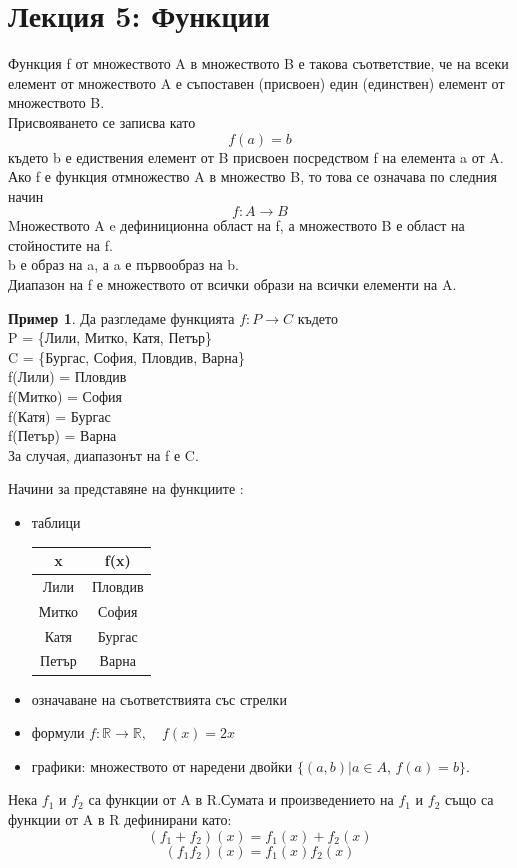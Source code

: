 \documentclass[fleqn, 12pt]{article}
\theoremstyle{definition}
\newtheorem{example}{Пример}[subsection]
\begin{document}
\section{Лекция 5: Функции}
Функция f от множеството A в множеството B е такова съответствие, че на всеки  елемент от множеството A е съпоставен (присвоен) един (единствен) елемент от множеството B.\\
Присвояването се записва като 
$$f(a) = b$$ 
където b е едиствения елемент от B присвоен посредством f на елемента a от A. Ако f е функция отмножество A в множество B, то това се означава по следния начин 
$$f: A \rightarrow B$$
Mножеството A  e дефиниционна област на f, а множеството B е област на стойностите на f. \\
b е образ на a, а a е първообраз на b. \\
Диапазон на f е множеството от всички образи на всички  елементи на A.\\
\begin{example}
Да разгледаме функцията $f: P \rightarrow C$ където \\
P = \{Лили, Митко, Катя, Петър\} \\
C = \{Бургас, София, Пловдив, Варна\}\\
f(Лили) = Пловдив \\
f(Митко) = София \\
f(Катя) = Бургас \\
f(Петър) = Варна \\
За случая, диапазонът на f е C. 
\end{example}
Начини за представяне на функциите :

\begin{itemize}
\item таблици 
\begin{table}[h!]
  \begin{center}
    \begin{tabular}{|c|c|} 
\hline
      \textbf{x} & \textbf{f(x)}\\
\hline
	Лили & Пловдив  \\ 
\hline
	Митко & София  \\
\hline
	Катя & Бургас \\
\hline
 	Петър & Варна \\  
\hline
    \end{tabular}
  \end{center}
\end{table}
\item означаване на съответствията със стрелки 
\item формули $f:\mathbb{R} \rightarrow \mathbb{R}, \quad f(x) = 2x$
\item графики: множеството от наредени двойки $ \{(a, b) | a \in A, \, f(a) = b\}$.
\end{itemize}
Нека $f_1$ и $f_2$ са функции от A в R.Сумата и произведението на $f_1$ и $f_2$ също са функции от A в R дефинирани като:
$$(f_1+ f_2)(x) =  f_1(x) + f_2(x)$$
$$(f_1f_2)(x) =  f_1(x) f_2(x)$$
\end{document}
